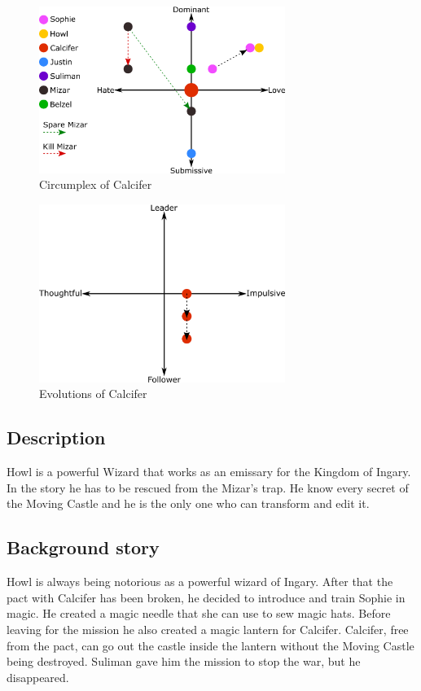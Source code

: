 \begin{figure}[H]
  \centering
  \includegraphics[width=8cm]{Images/Circumplexes/calciferCircumplex}
  \caption{Circumplex of Calcifer}
\end{figure}

\begin{figure}[H]
  \centering
  \includegraphics[width=8cm]{Images/Evolutions/calciferEvolution}
  \caption{Evolutions of Calcifer}
\end{figure}

\subsection{Description}
Howl is a powerful Wizard that works as an emissary for the Kingdom of Ingary. In the story he has to be rescued from the Mizar’s trap. He know every secret of the Moving Castle and he is the only one who can transform and edit it.

\subsection{Background story}
Howl is always being notorious as a powerful wizard of Ingary. After that the pact with Calcifer has been broken, he decided to introduce and train Sophie in magic. He created a magic needle that she can use to sew magic hats. Before leaving for the mission he also created a magic lantern for Calcifer. Calcifer, free from the pact, can go out the castle inside the lantern without the Moving Castle being destroyed. Suliman gave him the mission to stop the war, but he disappeared.
